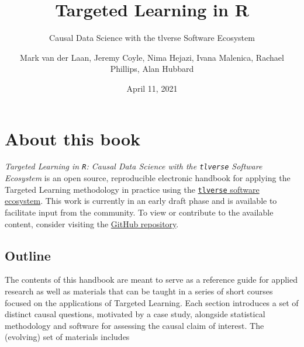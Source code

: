 \documentclass[12pt, krantz2,]{krantz}
\title{Targeted Learning in R}
\subtitle{Causal Data Science with the tlverse Software Ecosystem}
\author{Mark van der Laan, Jeremy Coyle, Nima Hejazi, Ivana Malenica, Rachael Phillips, Alan Hubbard}
\date{April 11, 2021}
\theoremstyle{definition}
\theoremstyle{definition}
\theoremstyle{definition}
\newcommand{\1}{\mathbbm{1}}
\begin{document}
\maketitle


\thispagestyle{empty}

\begin{center}
\end{center}

\setlength{\abovedisplayskip}{-5pt}
\setlength{\abovedisplayshortskip}{-5pt}

\mainmatter

{
\hypersetup{linkcolor=}
\setcounter{tocdepth}{3}
\tableofcontents
}
\listoftables
\listoffigures
\hypertarget{about-this-book}{%
\section*{About this book}\label{about-this-book}}


\emph{Targeted Learning in \texttt{R}: Causal Data Science with the \texttt{tlverse} Software
Ecosystem} is an open source, reproducible electronic handbook for applying the
Targeted Learning methodology in practice using the \href{https://github.com/tlverse}{\texttt{tlverse} software
ecosystem}. This work is currently in an early draft
phase and is available to facilitate input from the community. To view or
contribute to the available content, consider visiting the \href{https://github.com/tlverse/tlverse-handbook}{GitHub
repository}.

\hypertarget{outline}{%
\subsection{Outline}\label{outline}}

The contents of this handbook are meant to serve as a reference guide for
applied research as well as materials that can be taught in a series of short
courses focused on the applications of Targeted Learning. Each section
introduces a set of distinct causal questions, motivated by a case study,
alongside statistical methodology and software for assessing the causal claim of
interest. The (evolving) set of materials includes
\end{document}
